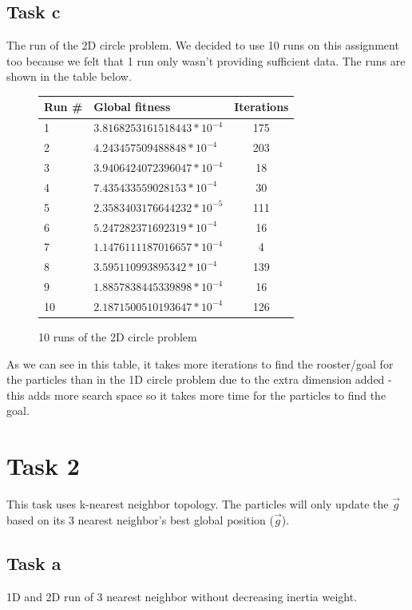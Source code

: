 \documentclass[12pt, a4paper]{article}
\begin{document}
\subsection{Task c}
The run of the 2D circle problem. We decided to use 10 runs on this assignment too because we felt that 1 run only wasn't providing sufficient data. The runs are shown in the table below.
\begin{figure}[H]
\begin{center}
\begin{tabular}{l| l  c}
Run \# & Global fitness& Iterations\\ \hline
1&$3.8168253161518443*10^{-4}$ & 175\\ 
2&$4.243457509488848*10^{-4}$ & 203\\
3&$3.9406424072396047*10^{-4}$ & 18\\ 
4&$7.435433559028153*10^{-4}$ & 30\\
5&$2.3583403176644232*10^{-5}$ & 111\\ 
6&$5.247282371692319*10^{-4}$ & 16\\ 
7&$1.1476111187016657*10^{-4}$ & 4\\ 
8&$3.595110993895342*10^{-4}$ & 139\\
9&$1.8857838445339898*10^{-4}$ & 16\\ 
10&$2.1871500510193647*10^{-4}$ & 126\\ 
\end{tabular}
\caption{10 runs of the 2D circle problem}
\end{center}
\end{figure}
As we can see in this table, it takes more iterations to find the rooster/goal for the particles than in the 1D circle problem due to the extra dimension added - this adds more search space so it takes more time for the particles to find the goal.

\section{Task 2}
This task uses k-nearest neighbor topology. The particles will only update the $\vec{g}$ based on its 3 nearest neighbor's best global position ($\vec{g}$). 
\subsection{Task a}
1D and 2D run of 3 nearest neighbor without decreasing inertia weight.
\end{document}
